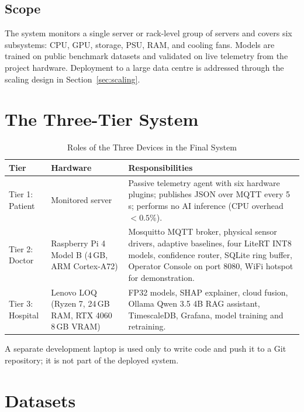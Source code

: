\documentclass[12pt,a4paper]{report}
\begin{document}
\subsection*{Scope}
The system monitors a single server or rack-level group of servers and covers six subsystems: CPU, GPU, storage, PSU, RAM, and cooling fans. Models are trained on public benchmark datasets and validated on live telemetry from the project hardware. Deployment to a large data centre is addressed through the scaling design in Section~\ref{sec:scaling}.

\section{The Three-Tier System}

\begin{table}[h!]
  \centering
  \caption{Roles of the Three Devices in the Final System}
  \label{tab:devices}
  \vspace*{5pt}
  \footnotesize
  \renewcommand{\arraystretch}{1.4}
  \begin{tabular}{|p{2.2cm}|p{3.4cm}|p{8cm}|}
    \hline
    \textbf{Tier} & \textbf{Hardware} & \textbf{Responsibilities} \\ \hline
    Tier 1: Patient & Monitored server & Passive telemetry agent with six hardware plugins; publishes JSON over MQTT every 5\,s; performs no AI inference (CPU overhead $<0.5\%$). \\ \hline
    Tier 2: Doctor & Raspberry Pi 4 Model B (4\,GB, ARM Cortex-A72) & Mosquitto MQTT broker, physical sensor drivers, adaptive baselines, four LiteRT INT8 models, confidence router, SQLite ring buffer, Operator Console on port 8080, WiFi hotspot for demonstration. \\ \hline
    Tier 3: Hospital & Lenovo LOQ (Ryzen 7, 24\,GB RAM, RTX 4060 8\,GB VRAM) & FP32 models, SHAP explainer, cloud fusion, Ollama Qwen 3.5 4B RAG assistant, TimescaleDB, Grafana, model training and retraining. \\ \hline
  \end{tabular}
\end{table}

A separate development laptop is used only to write code and push it to a Git repository; it is not part of the deployed system.

\section{Datasets}
\end{document}
